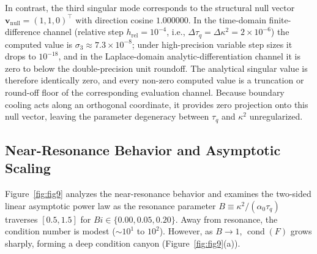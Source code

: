 \documentclass[preprint,12pt]{elsarticle}
\begin{document}
In contrast, the third singular mode corresponds to the structural null vector $\bm{v}_{\mathrm{null}} = (1, 1, 0)^\top$ with direction cosine $1.000000$. In the time-domain finite-difference channel (relative step $h_{\mathrm{rel}} = 10^{-4}$, i.e., $\Delta\tau_q = \Delta\kappa^2 = 2 \times 10^{-6}$) the computed value is $\sigma_3 \approx 7.3 \times 10^{-8}$; under high-precision variable step sizes it drops to $10^{-18}$, and in the Laplace-domain analytic-differentiation channel it is zero to below the double-precision unit roundoff. The analytical singular value is therefore identically zero, and every non-zero computed value is a truncation or round-off floor of the corresponding evaluation channel. Because boundary cooling acts along an orthogonal coordinate, it provides zero projection onto this null vector, leaving the parameter degeneracy between $\tau_q$ and $\kappa^2$ unregularized.

\subsection{Near-Resonance Behavior and Asymptotic Scaling}
\label{sec:near_resonance}

Figure~\ref{fig:fig9} analyzes the near-resonance behavior and examines the two-sided linear asymptotic power law as the resonance parameter $B \equiv \kappa^2 / (\alpha_0 \tau_q)$ traverses $[0.5, 1.5]$ for $Bi \in \{0.00, 0.05, 0.20\}$. Away from resonance, the condition number is modest ($\sim 10^1$ to $10^2$). However, as $B \to 1$, $\operatorname{cond}(F)$ grows sharply, forming a deep condition canyon (Figure~\ref{fig:fig9}(a)).
\end{document}
